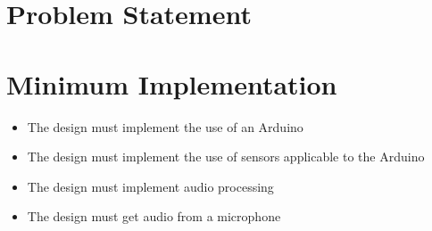 \section{Problem Statement}


\section{Minimum Implementation}
\begin{itemize}
	\item The design must implement the use of an Arduino
	\item The design must implement the use of sensors applicable to the Arduino
	\item The design must implement audio processing
	\item The design must get audio from a microphone
\end{itemize}

